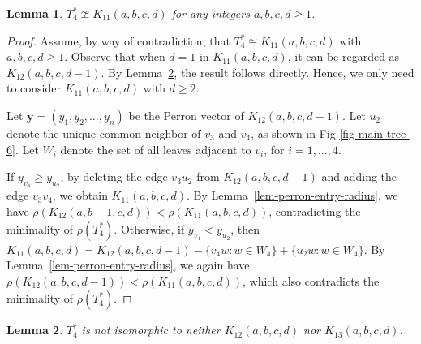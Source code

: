 \documentclass[12pt]{amsart}
\newtheorem{lem}{Lemma}[section]
\begin{document}
\begin{lem}\label{lem-3.16}
	$T_4^* \ncong K_{11}(a,b,c,d)$ for any integers $a,b,c,d \ge 1$.
\end{lem}
\begin{proof} Assume, by way of contradiction, that $T_4^* \cong K_{11}(a,b,c,d)$ with $a,b,c,d \ge 1$.
	Observe that when $d = 1$ in $K_{11}(a,b,c,d)$, it can be regarded as $K_{12}(a,b,c,d-1)$.
	By Lemma~\ref{notK12K13}, the result follows directly.
	Hence, we only need to consider $K_{11}(a,b,c,d)$ with $d \ge 2$.
	
	Let $\mathbf{y}=(y_1, y_2, \dots, y_n)$ be the Perron vector of $K_{12}(a,b,c,d-1)$. 
	Let $u_2$ denote the unique common neighbor of $v_3$ and $v_4$, as shown in Fig \ref{fig-main-tree-6}. Let $W_i$ denote the set of all leaves adjacent to $v_i$, for $i=1,\ldots,4$.
	
If $y_{v_4} \ge y_{u_2}$, by deleting the edge $v_3u_2$ from $K_{12}(a,b,c,d-1)$
	and adding the edge $v_3v_4$, we obtain $K_{11}(a,b,c,d)$.
	By Lemma~\ref{lem-perron-entry-radius}, we have $\rho(K_{12}(a,b-1,c,d)) < \rho(K_{11}(a,b,c,d))$,
	contradicting the minimality of $\rho(T_4^*)$. Otherwise, if $y_{v_4} < y_{u_2}$,
	then $K_{11}(a,b,c,d)=K_{12}(a,b,c,d-1)-\{v_4w:w \in W_4\}+\{u_2w:w \in W_4\}$. By Lemma~\ref{lem-perron-entry-radius}, we again have $\rho(K_{12}(a,b,c,d-1)) < \rho(K_{11}(a,b,c,d))$,
	which also contradicts the minimality of $\rho(T_4^*)$.
\end{proof}


\begin{lem}\label{notK12K13}
	\(T_4^*\) is not isomorphic to neither \(K_{12}(a,b,c,d)\) nor \(K_{13}(a,b,c,d)\).
\end{lem}
\end{document}

